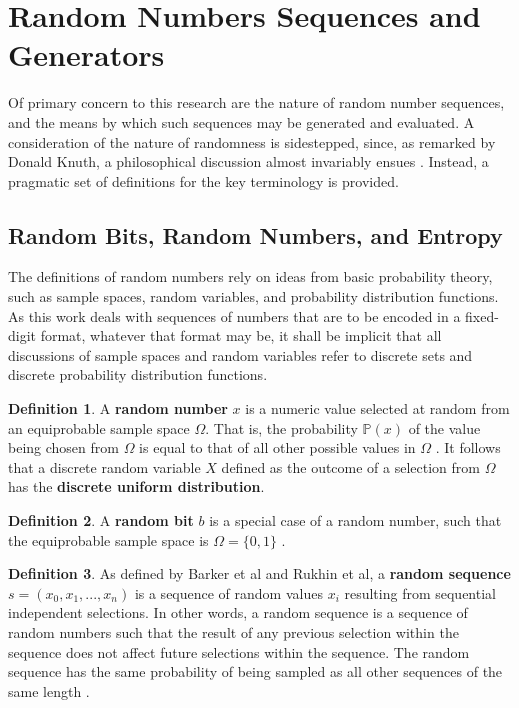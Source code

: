 \documentclass[12pt, titlepage]{report}
\theoremstyle{definition}
\newtheorem{definition}{Definition}
\begin{document}
\section{Random Numbers Sequences and Generators}
Of primary concern to this research are the nature of random number sequences, and the means by which such sequences may be generated and evaluated. A consideration of the nature of randomness is sidestepped, since, as remarked by Donald Knuth, a philosophical discussion almost invariably ensues \cite[p. 2]{donald1998art}. Instead, a pragmatic set of definitions for the key terminology is provided.

\subsection{Random Bits, Random Numbers, and Entropy}
The definitions of random numbers rely on ideas from basic probability theory, such as sample spaces, random variables, and probability distribution functions. As this work deals with sequences of numbers that are to be encoded in a fixed-digit format, whatever that format may be, it shall be implicit that all discussions of sample spaces and random variables refer to discrete sets and discrete probability distribution functions.

\begin{definition}
A \textbf{random number} $x$ is a numeric value selected at random from an equiprobable sample space $\Omega$. That is, the probability $\mathbb{P}(x)$ of the value being chosen from $\Omega$ is equal to that of all other possible values in $\Omega$ \cite[p. 7]{barker2007recommendation} \cite[s. 1.1.1]{rukhin2001statistical}. It follows that a discrete random variable $X$ defined as the outcome of a selection from $\Omega$ has the \textbf{discrete uniform distribution}.
\end{definition}

\begin{definition}
A \textbf{random bit} $b$ is a special case of a random number, such that the equiprobable sample space is $\Omega = \{0, 1\}$ \cite[s. 1.1.1]{rukhin2001statistical}.
\end{definition}

\begin{definition}
As defined by Barker et al and Rukhin et al, a \textbf{random sequence} $s = (x_0, x_1, ..., x_n)$ is a sequence of random values $x_i$ resulting from sequential independent selections. In other words, a random sequence is a sequence of random numbers such that the result of any previous selection within the sequence does not affect future selections within the sequence. The random sequence has the same probability of being sampled as all other sequences of the same length \cite[p. 7]{barker2007recommendation} \cite[s. 1.1.1]{rukhin2001statistical}.
\end{definition}
\end{document}

